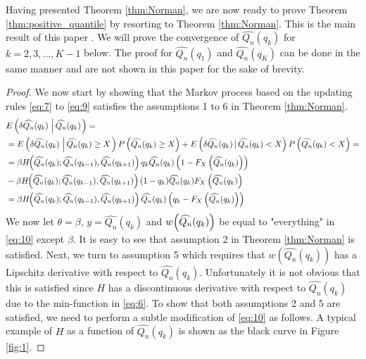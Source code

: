 \documentclass[10pt, a4paper]{article}
\newtheorem{rational for conjecture}{Rational for Conjecture}
\begin{document}
Having presented Theorem \ref{thm:Norman}, we are now ready to prove Theorem \ref{thm:positive_quantile} by resorting to Theorem \ref{thm:Norman}. This is the main result of this paper .
We will prove the convergence of $\widehat{Q_n}(q_k)$ for $k=2,3,\ldots,K-1$ below. The proof for $\widehat{Q_n}(q_1)$ and $\widehat{Q_n}(q_K)$ can be done in the same manner and are not shown in this paper for the sake of brevity.
\begin{proof}
We now start by showing that the Markov process based on the updating rules \eqref{eq:7} to \eqref{eq:9} satisfies the assumptions 1 to 6 in Theorem \ref{thm:Norman}.
\begin{align}
\notag
  &E\left(\delta \widehat{Q_{n}}(q_k)\,\left|\,\widehat{Q_n}(q_k)\right.\right) = \\
\notag
  & = E\left(\delta \widehat{Q_{n}}(q_k)\,\left|\,\widehat{Q_n}(q_k) \geq X\right. \right) P\left(\widehat{Q_n}(q_k) \geq X \right) + E\left(\delta \widehat{Q_{n}}(q_k)\,|\,\widehat{Q_n}(q_k) < X\right) P\left(\widehat{Q_n}(q_k) < X\right) = \\
\notag
  & = \beta H\hspace{-1mm}\left(\widehat{Q_{n}}(q_{k}); \widehat{Q_{n}}(q_{k-1}), \widehat{Q_{n}}(q_{k+1}) \right) q_k \widehat{Q_{n}}(q_{k})\left(1 - F_X\left(\widehat{Q_{n}}(q_{k})\right)\right) \\
\notag
  & - \beta H\hspace{-1mm}\left(\widehat{Q_{n}}(q_{k}); \widehat{Q_{n}}(q_{k-1}), \widehat{Q_{n}}(q_{k+1}) \right) (1 - q_k) \widehat{Q_{n}}(q_{k}) F_X\left(\widehat{Q_{n}}(q_{k})\right) \\
\label{eq:10}
  &= \beta H\hspace{-1mm}\left(\widehat{Q_{n}}(q_{k}); \widehat{Q_{n}}(q_{k-1}), \widehat{Q_{n}}(q_{k+1}) \right) \widehat{Q_{n}}(q_{k}) \left(q_k - F_X\left(\widehat{Q_{n}}(q_{k})\right)\right)
\end{align}
We now let $\theta = \beta$, $y = \widehat{Q_{n}}(q_{k})$ and $w\hspace{-0.5mm}\left(\widehat{Q_{n}}(q_{k})\right)$ be equal to "everything" in \eqref{eq:10} except $\beta$. It is easy to see that assumption 2 in Theorem \ref{thm:Norman} is satisfied. Next, we turn to assumption 5 which requires that $w\left(\widehat{Q_{n}}(q_{k})\right)$ has a Lipschitz derivative with respect to $\widehat{Q_{n}}(q_{k})$. Unfortunately it is not obvious that this is satisfied since $H$ has a discontinuous derivative with respect to $\widehat{Q_{n}}(q_{k})$ due to the min-function in \eqref{eq:6}. To show that both assumptions 2 and 5 are satisfied, we need to perform a subtle modification of \eqref{eq:10} as follows. A typical example of $H$ as a function of $\widehat{Q_{n}}(q_{k})$ is shown as the black curve in Figure \ref{fig:1}.

\end{proof}
\end{document}
